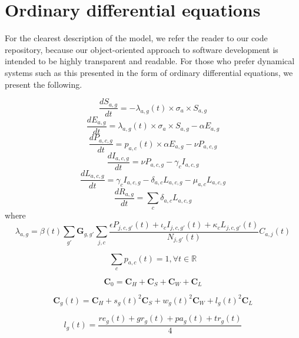
\section{Ordinary differential equations}

For the clearest description of the model, we refer the reader to our code repository, because our object-oriented approach to software development is intended to be highly transparent and readable. For those who prefer dynamical systems such as this presented in the form of ordinary differential equations, we present the following.

\[\frac{dS_{a,g}}{dt}=-\lambda_{a,g}(t)\times\sigma_{a}\times S_{a,g}\]
\[\frac{dE_{a,g}}{dt}=\lambda_{a,g}(t)\times\sigma_{a}\times S_{a,g}-\alpha E_{a,g}\]
\[\frac{dP_{a,c,g}}{dt}=p_{a,c}(t)\times \alpha E_{a,g}-\nu P_{a,c,g}\]
\[\frac{dI_{a,c,g}}{dt}=\nu P_{a,c,g}-\gamma_{c}I_{a,c,g}\]
\[\frac{dL_{a,c,g}}{dt}=\gamma_{c}I_{a,c,g}-\delta_{a,c}L_{a,c,g}-\mu_{a,c}L_{a,c,g}\]
\[\frac{dR_{a,g}}{dt}=\sum_{c}{}\delta_{a,c}L_{a,c,g}\]
where
\[\lambda_{a,g}=\beta(t)\sum_{g'}\textbf{G}_{g,g'} \sum_{j,c}\frac{\epsilon P_{j,c,g'}(t)+\iota_{c}I_{j,c,g'}(t)+\kappa_{c}L_{j,c,g'}(t)}{N_{j,g'}(t)} C_{a,j}(t)\]

\[\sum_{c}p_{a,c}(t)=1,\forall t\in\mathbb{R}\]

\[\textbf{C}_{0}=\textbf{C}_{H}+\textbf{C}_{S}+\textbf{C}_{W}+\textbf{C}_{L}\]

\[\textbf{C}_{g}(t)=\textbf{C}_{H}+s_{g}(t)^{2}\textbf{C}_{S}+w_{g}(t)^{2}\textbf{C}_{W}+l_{g}(t)^{2}\textbf{C}_{L}\]

\[l_{g}(t)=\frac{re_{g}(t)+gr_{g}(t)+pa_{g}(t)+tr_{g}(t)}{4}\]



